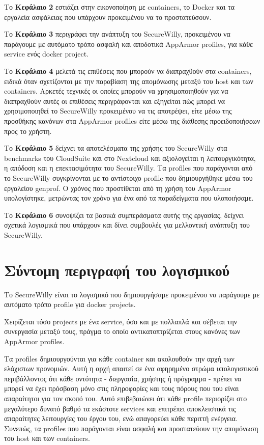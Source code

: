Το \textbf{Κεφάλαιο 2} εστιάζει στην εικονοποίηση με \en containers\gr{}, το \en Docker\gr{} και τα εργαλεία ασφάλειας που υπάρχουν προκειμένου να το προστατεύσουν. 

Το \textbf{Κεφάλαιο 3} περιγράφει την ανάπτυξη του \en SecureWilly\gr{}, προκειμένου να παράγουμε με αυτόματο τρόπο ασφαλή και αποδοτικά \en AppArmor profiles\gr{}, για κάθε service ενός \en docker project\gr. 

Το \textbf{Κεφάλαιο 4} μελετά τις επιθέσεις που μπορούν να διαπραχθούν στα \en containers\gr{}, ειδικά όταν σχετίζονται με την παραβίαση της απομόνωσης μεταξύ του \en host\gr{} και των \en containers\gr{}. Αρκετές τεχνικές οι οποίες μπορούν να χρησιμοποιηθούν για να διαπραχθούν αυτές οι επιθέσεις περιγράφονται και εξηγείται πώς μπορεί να χρησιμοποιηθεί το \en SecureWilly\gr{} προκειμένου να τις αποτρέψει, είτε μέσω της προσθήκης κανόνων στα \en AppArmor profiles\gr{} είτε μέσω της διάθεσης προειδοποιήσεων προς το χρήστη.

Το \textbf{Κεφάλαιο 5} δείχνει τα αποτελέσματα της χρήσης του \en SecureWilly\gr{} στα \en benchmarks\gr{} του \en CloudSuite\gr{} και στο \en Nextcloud\gr{} και αξιολογείται η λειτουργικότητα, η απόδοση και η επεκτασιμότητα του \en SecureWilly\gr{}. Τα \en profiles\gr{} που παράγονται από το \en SecureWilly\gr{} συγκρίνονται με το αντίστοιχο \en profile\gr{} που δημιουργήθηκε μέσω του εργαλείου \en genprof\gr{}. Ο χρόνος που προστίθεται από τη χρήση του \en AppArmor\gr{} υπολογίστηκε, μετρώντας τον χρόνο για ένα από τα παραδείγματα που υλοποιήσαμε.

Το \textbf{Κεφάλαιο 6} συνοψίζει τα βασικά συμπεράσματα αυτής της εργασίας, δείχνει σχετικά λογισμικά που υπάρχουν και δίνει συμβουλές για μελλοντική ανάπτυξη του \en SecureWilly\gr{}.

\section*{Σύντομη περιγραφή του λογισμικού}
Το \en SecureWilly\gr{} είναι το λογισμικό που δημιουργήσαμε προκειμένου να παράγουμε με αυτόματο τρόπο \en profile\gr{} για \en docker projects\gr{}.

Χειρίζεται τόσο \en projects\gr{} με ένα \en service\gr{}, όσο και με πολλαπλά και σέβεται την συνεργασία μεταξύ τους, πράγμα το οποίο αντικατοπτρίζεται στους κανόνες των \en AppArmor profiles\gr{}.

Τα \en profiles\gr{} δημιουργούνται για κάθε \en container\gr{} και ακολουθούν την αρχή των ελάχιστων προνομιών. Αυτή η αρχή απαιτεί σε ένα αφηρημένο στρώμα υπολογιστικού περιβάλλοντος ότι κάθε οντότητα - διεργασία, χρήστης ή πρόγραμμα - πρέπει να μπορεί να έχει πρόσβαση μόνο στις πληροφορίες και τους πόρους που του είναι απαραίτητοι για τον σκοπό του. Αυτό επιβεβαιώνει ότι κάθε \en profile\gr{} περιορίζει στο μεγαλύτερο δυνατό βαθμό τα εκάστοτε \en services\gr{} και επιτρέπει αποκλειστικά τις απαραίτητες λειτουργίες του έργου του, ενώ απαγορεύει κάθε περιττή ενέργεια. Συνεπώς, τα \en profiles\gr{} που παράγονται είναι ασφαλή και προστατεύουν την απομόνωση του \en host\gr{} και των \en containers\gr{}.

